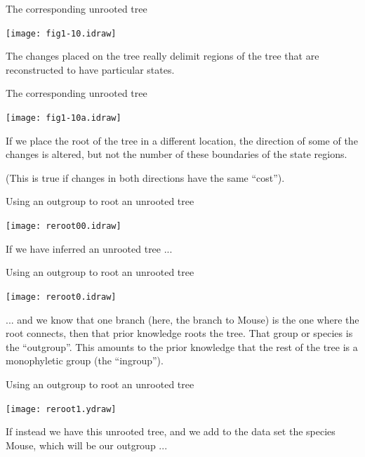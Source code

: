 \documentclass[bluish,slideColor,colorBG,pdf]{prosper}
\begin{document}
\begin{slide}[Replace]{The corresponding unrooted tree}

\centerline{\texttt{[image: fig1-10.idraw]}}
\bigskip

The changes placed on the tree really delimit regions of the tree that are
reconstructed to have particular states. 

\end{slide}

\begin{slide}[Replace]{The corresponding unrooted tree}

\centerline{\texttt{[image: fig1-10a.idraw]}}
\bigskip

If we place the root of the tree
in a different location, the direction of some of the changes is altered, but
not the number of these boundaries of the state regions.
\medskip

(This is true if changes in both directions have the same ``cost'').

\end{slide}

\begin{slide}[Replace]{Using an outgroup to root an unrooted tree}
\bigskip

\centerline{\texttt{[image: reroot00.idraw]}}
\bigskip

If we have inferred an unrooted tree ...

\end{slide}

\begin{slide}[Replace]{Using an outgroup to root an unrooted tree}
\bigskip

\centerline{\texttt{[image: reroot0.idraw]}}
\bigskip

... and we know that one branch (here, the branch to Mouse) is the one
where the root connects, then that prior knowledge roots the tree.  That
group or species is the ``outgroup''.  This amounts to the prior knowledge
that the rest of the tree is a monophyletic group (the ``ingroup'').

\end{slide}

\begin{slide}[Replace]{Using an outgroup to root an unrooted tree}
\bigskip

\centerline{\texttt{[image: reroot1.ydraw]}}
\bigskip

If instead we have this unrooted tree, and we add to the data set the
species Mouse, which will be our outgroup ...

\end{slide}
\end{document}
